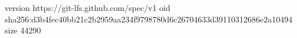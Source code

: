 version https://git-lfs.github.com/spec/v1
oid sha256:d3b4fec40bb21c2b2959aa234f9798780d6c26704633d39110312686e2a10494
size 44290
